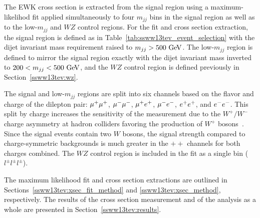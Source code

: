 
The \ssww EWK cross section is extracted from the signal region using a maximum-likelihod fit applied simultaneously to four $m_{jj}$ bins in the signal region as well as to the low-$m_{jj}$ and $WZ$ control regions.
For the fit and cross section extraction, the signal region is defined as in Table~\ref{tab:ssww13tev_event_selection} with the dijet invariant mass requirement raised to $m_{jj} > 500\gev$.
The low-$m_{jj}$ region is defined to mirror the signal region exactly with the dijet invariant mass inverted to $200 < m_{jj} < 500\gev$, and the $WZ$ control region is defined previously in Section~\ref{ssww13tev:wz}.

The signal and low-$m_{jj}$ regions are split into six channels based on the flavor and charge of the dilepton pair: $\mu^{+}\mu^{+}$, $\mu^{-}\mu^{-}$, $\mu^{+}e^{+}$, $\mu^{-}e^{-}$, $e^{+}e^{+}$, and $e^{-}e^{-}$.
This split by charge increases the sensitivity of the measurement due to the $W^{+}/W^{-}$ charge asymmetry at hadron colliders favoring the production of $W^{+}$ bosons~\cite{2010.w-charge-asymmetry}.
Since the signal events contain two $W$ bosons, the signal strength compared to charge-symmetric backgrounds is much greater in the $++$ channels for both charges combined.
The $WZ$ control region is included in the fit as a single bin ($l^{\pm}l^{\pm}l^{\pm}$).

The maximum likelihood fit and cross section extractions are outlined in Sections~\ref{ssww13tev:xsec_fit_method} and \ref{ssww13tev:xsec_method}, respectively.
The results of the cross section measurement and of the analysis as a whole are presented in Section~\ref{ssww13tev:results}.

